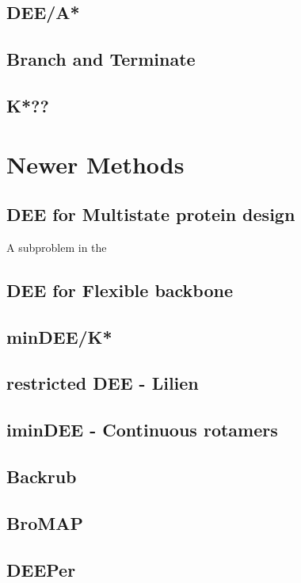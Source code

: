 \documentclass{article}
\begin{document}
\subsection{DEE/A*}

\subsection{Branch and Terminate}

\subsection{K*??} 

\section{Newer Methods}

\subsection{DEE for Multistate protein design}
A subproblem in the 

\subsection{DEE for Flexible backbone}

\subsection{minDEE/K*}

\subsection{restricted DEE - Lilien}

\subsection{iminDEE - Continuous rotamers}

\subsection{Backrub}

\subsection{BroMAP}

\subsection{DEEPer}
\end{document}
